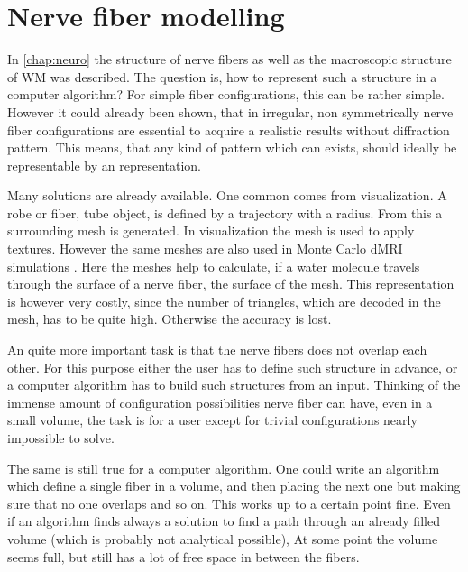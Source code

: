 \setcounter{chapter}{3}
\chapter{Nerve fiber modelling}
\label{chap:sof:modelling}
% 
\par
In \cref{chap:neuro} the structure of nerve fibers as well as the macroscopic structure of \ac{WM} was described.
The question is, how to represent such a structure in a computer algorithm?
For simple fiber configurations, this can be rather simple.
However it could already been shown, that in \dummy{} \cite{MenzelDissertation} irregular, non symmetrically nerve fiber configurations are essential to acquire a realistic results without diffraction pattern.
This means, that any kind of pattern which can exists, should ideally be representable by an representation.
\par
% 
Many solutions are already available.
One common comes from visualization.
A robe or fiber, \ie{} tube object, is defined by a trajectory with a radius.
From this a surrounding mesh is generated.
In visualization the mesh is used to apply textures. 
However the same meshes are also used in Monte Carlo \ac{dMRI} simulations \cite{Ginsburger2019,ginsburgerDis2019}.
Here the meshes help to calculate, if a water molecule travels through the surface of a nerve fiber, \ie{} the surface of the mesh.
This representation is however very costly, since the number of triangles, which are decoded in the mesh, has to be quite high.
Otherwise the accuracy is lost.
\par
% 
An quite more important task is that the nerve fibers does not overlap each other.
For this purpose either the user has to define such structure in advance, or a computer algorithm has to build such structures from an input.
Thinking of the immense amount of configuration possibilities nerve fiber can have, even in a small volume, the task is for a user except for trivial configurations nearly impossible to solve.
\par
% 
The same is still true for a computer algorithm.
One could \eg{} write an algorithm which define a single fiber in a volume, and then placing the next one but making sure that no one overlaps and so on.
This works up to a certain point fine.
Even if an algorithm finds always a solution to find a path through an already filled volume (which is probably not analytical possible), At some point the volume seems full, but still has a lot of free space in between the fibers.
